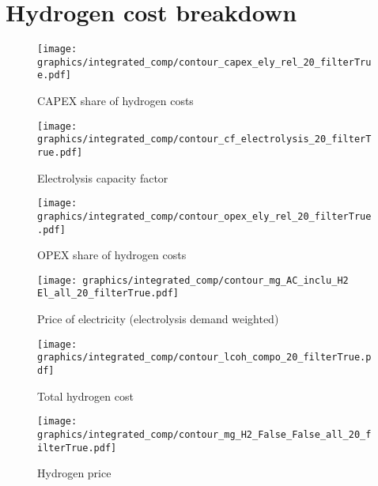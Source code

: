 \section{Hydrogen cost breakdown}
\label{subsec:electrolysis_op_comp}



\begin{figure*}[h!]
    \centering
    \begin{subfigure}[b]{0.45\linewidth}
        \centering
        \texttt{[image: graphics/integrated\_comp/contour\_capex\_ely\_rel\_20\_filterTrue.pdf]}
        \caption{CAPEX share of hydrogen costs}
        \label{fig:capex-rel}
    \end{subfigure}
    \hfill
    \begin{subfigure}[b]{0.45\linewidth}
        \centering
        \texttt{[image: graphics/integrated\_comp/contour\_cf\_electrolysis\_20\_filterTrue.pdf]}
        \caption{Electrolysis capacity factor}
        \label{fig:ely-cf}
    \end{subfigure}
    \hfill
    \begin{subfigure}[b]{0.45\linewidth}
        \centering
        \texttt{[image: graphics/integrated\_comp/contour\_opex\_ely\_rel\_20\_filterTrue.pdf]}
        \caption{OPEX share of hydrogen costs}
        \label{fig:opex-rel}
    \end{subfigure}
    \hfill
    \begin{subfigure}[b]{0.45\linewidth}
        \centering
        \texttt{[image: graphics/integrated\_comp/contour\_mg\_AC\_inclu\_H2 El\_all\_20\_filterTrue.pdf]}
        \caption{Price of electricity (electrolysis demand weighted)}
        \label{fig:electricity-price}
    \end{subfigure}
    \hfill
    \begin{subfigure}[b]{0.45\linewidth}
        \centering
        \texttt{[image: graphics/integrated\_comp/contour\_lcoh\_compo\_20\_filterTrue.pdf]}
        \caption{Total hydrogen cost}
        \label{fig:hydrogen-cost}
    \end{subfigure}
    \hfill
    \begin{subfigure}[b]{0.45\linewidth}
        \centering
        \texttt{[image: graphics/integrated\_comp/contour\_mg\_H2\_False\_False\_all\_20\_filterTrue.pdf]}
        \caption{Hydrogen price}
        \label{fig:hydrogen-price}
    \end{subfigure}
    \hfill
    
    \caption{Cost components of hydrogen electrolysis (CAPEX \ref{fig:capex-rel} and \ref{fig:opex-rel}) and combined cost of hydrogen via electrolysis (\ref{fig:hydrogen-cost}) along with the electrolysers capacity factor (\ref{fig:ely-cf} (influencing the CAPEX share)) and price of electricity (\ref{fig:fig:electricity-price}) (influencing the OPEX share). Marginal price of hydrogen (fig:hydrogen-price) for comparison.}
    \label{fig:electrolysis_op_comp}
\end{figure*}

\clearpage